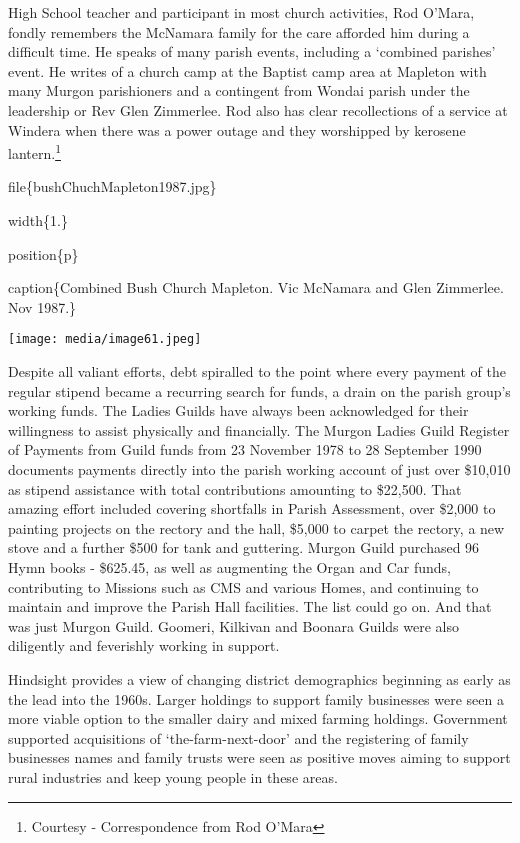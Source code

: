 High School teacher and participant in most church activities, Rod O'Mara, fondly remembers the McNamara family for the care afforded him during a difficult time. He speaks of many parish events, including a `combined parishes' event. He writes of a church camp at the Baptist camp area at Mapleton with many Murgon parishioners and a contingent from Wondai parish under the leadership or Rev Glen Zimmerlee. Rod also has clear recollections of a service at Windera when there was a power outage and they worshipped by kerosene lantern.\footnote{Courtesy - Correspondence from Rod O'Mara}

file\{bushChuchMapleton1987.jpg\}

width\{1.\}

position\{p\}

caption\{Combined Bush Church Mapleton. Vic McNamara and Glen Zimmerlee. Nov 1987.\}

\texttt{[image: media/image61.jpeg]}

Despite all valiant efforts, debt spiralled to the point where every payment of the regular stipend became a recurring search for funds, a drain on the parish group's working funds. The Ladies Guilds have always been acknowledged for their willingness to assist physically and financially. The Murgon Ladies Guild Register of Payments from Guild funds from 23 November 1978 to 28 September 1990 documents payments directly into the parish working account of just over \$10,010 as stipend assistance with total contributions amounting to \$22,500. That amazing effort included covering shortfalls in Parish Assessment, over \$2,000 to painting projects on the rectory and the hall, \$5,000 to carpet the rectory, a new stove and a further \$500 for tank and guttering. Murgon Guild purchased 96 Hymn books - \$625.45, as well as augmenting the Organ and Car funds, contributing to Missions such as CMS and various Homes, and continuing to maintain and improve the Parish Hall facilities. The list could go on. And that was just Murgon Guild. Goomeri, Kilkivan and Boonara Guilds were also diligently and feverishly working in support.

Hindsight provides a view of changing district demographics beginning as early as the lead into the 1960s. Larger holdings to support family businesses were seen a more viable option to the smaller dairy and mixed farming holdings. Government supported acquisitions of `the-farm-next-door' and the registering of family businesses names and family trusts were seen as positive moves aiming to support rural industries and keep young people in these areas.

